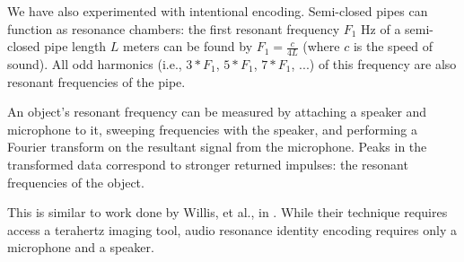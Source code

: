 
We have also experimented with intentional encoding.  Semi-closed pipes can function as resonance chambers: the first resonant frequency $F_1$ Hz of a semi-closed pipe length $L$ meters can be found by $F_1 = \frac{c}{4L}$ (where $c$ is the speed of sound).  All odd harmonics (i.e., $3*F_1$, $5*F_1$, $7*F_1$, ...) of this frequency are also resonant frequencies of the pipe. 

An object's resonant frequency can be measured by attaching a speaker and microphone to it, sweeping frequencies with the speaker, and performing a Fourier transform on the resultant signal from the microphone.  Peaks in the transformed data correspond to stronger returned impulses: the resonant frequencies of the object.

This is similar to work done by Willis, et al., in \cite{Willis-infrastructs}.  While their technique requires access a terahertz imaging tool, audio resonance identity encoding requires only a microphone and a speaker.

